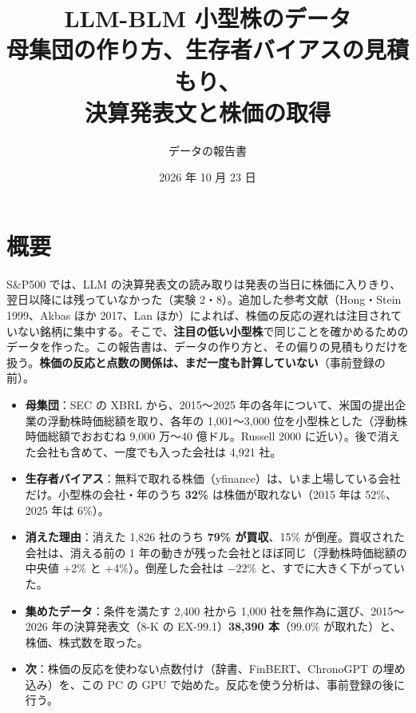 \documentclass[xelatex,ja=standard,jafont=haranoaji,a4paper,10pt,openany]{bxjsreport}
\title{LLM-BLM 小型株のデータ\\[6pt]
  \large 母集団の作り方、生存者バイアスの見積もり、\\決算発表文と株価の取得}
\author{データの報告書}
\date{2026 年 10 月 23 日}
\newcommand{\SP}{S\&P500}
\begin{document}
\maketitle

\chapter*{概要}

\SP{} では、LLM の決算発表文の読み取りは発表の当日に株価に入りきり、翌日以降には残っていなかった（実験 2・8）。追加した参考文献（Hong・Stein 1999、Akbas ほか 2017、Lan ほか）によれば、株価の反応の遅れは注目されていない銘柄に集中する。そこで、\textbf{注目の低い小型株}で同じことを確かめるためのデータを作った。この報告書は、データの作り方と、その偏りの見積もりだけを扱う。\textbf{株価の反応と点数の関係は、まだ一度も計算していない}（事前登録の前）。

\begin{keybox}[要点]
\begin{itemize}
\item \textbf{母集団}：SEC の XBRL から、2015〜2025 年の各年について、米国の提出企業の浮動株時価総額を取り、各年の 1,001〜3,000 位を小型株とした（浮動株時価総額でおおむね 9,000 万〜40 億ドル。Russell 2000 に近い）。後で消えた会社も含めて、一度でも入った会社は 4,921 社。
\item \textbf{生存者バイアス}：無料で取れる株価（yfinance）は、いま上場している会社だけ。小型株の会社・年のうち \textbf{32\%} は株価が取れない（2015 年は 52\%、2025 年は 6\%）。
\item \textbf{消えた理由}：消えた 1,826 社のうち \textbf{79\% が買収}、15\% が倒産。買収された会社は、消える前の 1 年の動きが残った会社とほぼ同じ（浮動株時価総額の中央値 +2\% と +4\%）。倒産した会社は $-22\%$ と、すでに大きく下がっていた。
\item \textbf{集めたデータ}：条件を満たす 2,400 社から 1,000 社を無作為に選び、2015〜2026 年の決算発表文（8-K の EX-99.1）\textbf{38,390 本}（99.0\% が取れた）と、株価、株式数を取った。
\item \textbf{次}：株価の反応を使わない点数付け（辞書、FinBERT、ChronoGPT の埋め込み）を、この PC の GPU で始めた。反応を使う分析は、事前登録の後に行う。
\end{itemize}
\end{keybox}

\tableofcontents

\end{document}

